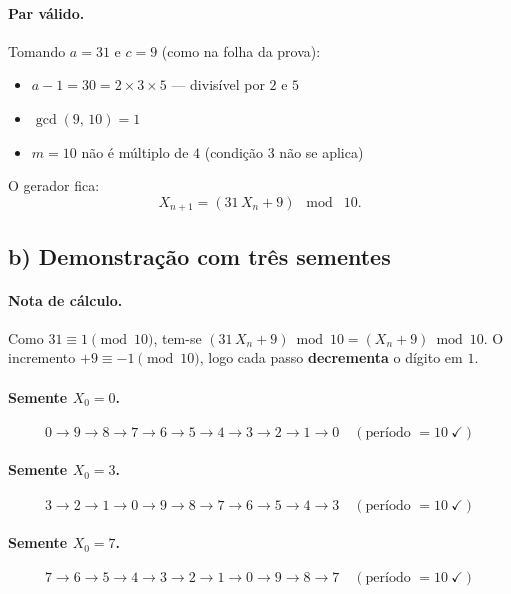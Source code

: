 \documentclass[12pt,a4paper]{article}
\theoremstyle{definition}
\newcommand{\resultado}[1]{%
  \begin{center}
    \fbox{\parbox{0.85\linewidth}{\centering $\displaystyle #1$}}
  \end{center}
}
\begin{document}
\paragraph{Par v\'alido.}
Tomando $a = 31$ e $c = 9$ (como na folha da prova):
\begin{itemize}
  \item $a - 1 = 30 = 2 \times 3 \times 5$ --- divis\'ivel por $2$ e $5$ \checkmark
  \item $\gcd(9,\,10) = 1$ \checkmark
  \item $m = 10$ n\~ao \'e m\'ultiplo de $4$ (condição 3 n\~ao se aplica) \checkmark
\end{itemize}
\resultado{(a,c) = (31,\;9)}

O gerador fica:
\begin{equation}
  X_{n+1} = (31\,X_n + 9)\;\bmod\;10.
\end{equation}

\subsection{b) Demonstra\c{c}\~ao com tr\^es sementes}

\paragraph{Nota de c\'alculo.}
Como $31 \equiv 1\pmod{10}$, tem-se $(31\,X_n + 9)\bmod 10 = (X_n + 9)\bmod 10$.
O incremento $+9 \equiv -1\pmod{10}$, logo cada passo \textbf{decrementa} o d\'igito em $1$.

\paragraph{Semente $X_0 = 0$.}
\begin{equation}
  0 \to 9 \to 8 \to 7 \to 6 \to 5 \to 4 \to 3 \to 2 \to 1 \to 0 \quad
  (\text{per\'iodo } = 10\ \checkmark)
\end{equation}

\paragraph{Semente $X_0 = 3$.}
\begin{equation}
  3 \to 2 \to 1 \to 0 \to 9 \to 8 \to 7 \to 6 \to 5 \to 4 \to 3 \quad
  (\text{per\'iodo } = 10\ \checkmark)
\end{equation}

\paragraph{Semente $X_0 = 7$.}
\begin{equation}
  7 \to 6 \to 5 \to 4 \to 3 \to 2 \to 1 \to 0 \to 9 \to 8 \to 7 \quad
  (\text{per\'iodo } = 10\ \checkmark)
\end{equation}
\end{document}
